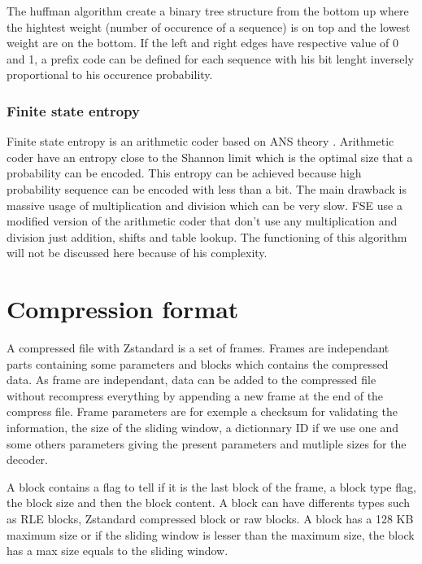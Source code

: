 \documentclass{sig-alternate-05-2015}
\begin{document}
        The huffman algorithm create a binary tree structure from the bottom up where the hightest
        weight (number of occurence of a sequence) is on top and the lowest weight are on the
        bottom. If the left and right edges have respective value of 0 and 1, a prefix code can be
        defined for each sequence with his bit lenght inversely proportional to his occurence
        probability.

    \subsubsection{Finite state entropy}
        Finite state entropy \cite{fse} is an arithmetic coder based on ANS theory \cite{ANS2013}.
        Arithmetic coder have an entropy close to the Shannon limit which is the optimal size that a
        probability can be encoded. This entropy can be achieved because high probability sequence
        can be encoded with less than a bit. The main drawback is massive usage of multiplication
        and division which can be very slow. FSE use a modified version of the arithmetic coder that
        don't use any multiplication and division just addition, shifts and table lookup. The
        functioning of this algorithm will not be discussed here because of his complexity.

\section{Compression format}
    A compressed file with Zstandard \cite{compress_format} is a set of frames. Frames are
    independant parts containing some parameters and blocks which contains the compressed data. As
    frame are independant, data can be added to the compressed file without recompress everything by
    appending a new frame at the end of the compress file. Frame parameters are for exemple a
    checksum for validating the information, the size of the sliding window, a dictionnary ID if we
    use one and some others parameters giving the present parameters and mutliple sizes for the
    decoder.

    A block contains a flag to tell if it is the last block of the frame, a block type flag, the
    block size and then the block content. A block can have differents types such as RLE blocks,
    Zstandard compressed block or raw blocks. A block has a 128 KB maximum size or if the sliding
    window is lesser than the maximum size, the block has a max size equals to the sliding window.
\end{document}
